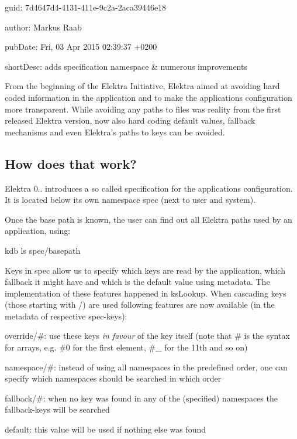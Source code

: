 
\begin{DoxyItemize}
\item guid\+: 7d4647d4-\/4131-\/411e-\/9c2a-\/2aca39446e18
\item author\+: Markus Raab
\item pub\+Date\+: Fri, 03 Apr 2015 02\+:39\+:37 +0200
\item short\+Desc\+: adds specification namespace \& numerous improvements
\end{DoxyItemize}

From the beginning of the Elektra Initiative, Elektra aimed at avoiding hard coded information in the application and to make the application\textquotesingle{}s configuration more transparent. While avoiding any paths to files was reality from the first released Elektra version, now also hard coding default values, fallback mechanisms and even Elektra’s paths to keys can be avoided.

\subsection*{How does that work?}

Elektra 0.. introduces a so called specification for the application\textquotesingle{}s configuration. It is located below its own namespace {\ttfamily spec} (next to user and system).

Once the base path is known, the user can find out all Elektra paths used by an application, using\+:


\begin{DoxyCode}
kdb ls spec/basepath
\end{DoxyCode}


Keys in {\ttfamily spec} allow us to specify which keys are read by the application, which fallback it might have and which is the default value using metadata. The implementation of these features happened in {\ttfamily ks\+Lookup}. When cascading keys (those starting with {\ttfamily /}) are used following features are now available (in the metadata of respective {\ttfamily spec}-\/keys)\+:


\begin{DoxyItemize}
\item {\ttfamily override/\#}\+: use these keys {\itshape in favour} of the key itself (note that {\ttfamily \#} is the syntax for arrays, e.\+g. {\ttfamily \#0} for the first element, {\ttfamily \#\+\_} for the 11th and so on)
\item {\ttfamily namespace/\#}\+: instead of using all namespaces in the predefined order, one can specify which namespaces should be searched in which order
\item {\ttfamily fallback/\#}\+: when no key was found in any of the (specified) namespaces the {\ttfamily fallback}-\/keys will be searched
\item {\ttfamily default}\+: this value will be used if nothing else was found
\end{DoxyItemize}

